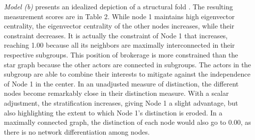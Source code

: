 \documentclass[12pt]{article}
\begin{document}
\textit{Model (b)} presents an idealized depiction of a structural fold \citep{vedres2010structural}. The resulting measurement scores are in Table 2. While node 1 maintains high eigenvector centrality, the eigenvector centrality of the other nodes increases, while their constraint decreases. It is actually the constraint of Node 1 that increases, reaching 1.00 because all its neighbors are maximally interconnected in their respective subgroups. This position of brokerage is more constrained than the star graph because the other actors are connected in subgroups. The actors in the subgroup are able to combine their interests to mitigate against the independence of Node 1 in the center. In an unadjusted measure of distinction, the different nodes become remarkably close in their distinction measure. With a scalar adjustment, the stratification increases, giving Node 1 a slight advantage, but also highlighting the extent to which Node 1's distinction is eroded. In a maximally connected graph, the distinction of each node would also go to 0.00, as there is no network differentiation among nodes. 
\end{document}
